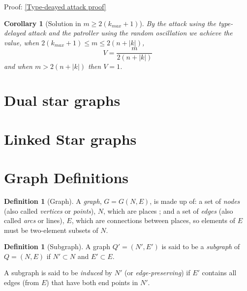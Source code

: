 \documentclass[a4paper,10pt]{article}
\newtheorem{corollary}[theorem]{Corollary}
\theoremstyle{definition}
\newtheorem{definition}[theorem]{Definition}
\theoremstyle{definition}
\theoremstyle{remark}
\theoremstyle{definition}
\begin{document}
Proof: \ref{Type-deayed attack proof}


\begin{corollary}[Solution in $m \geq 2(k_{max}+1)$]
By the attack using the type-delayed attack and the patroller using the random oscillation we achieve the value, when $2(k_{max}+1) \leq m \leq 2(n+|k|)$,
$$V= \frac{m}{2(n+|k|)} $$
and when $m > 2(n+|k|)$ then $V=1$.
\end{corollary}

\section{Dual star graphs}

\section{Linked Star graphs}




\newpage
\appendix
{}
\appendixpage
\addappheadtotoc
\section{Graph Definitions}

\begin{definition}[Graph]
A \textit{graph}, $G=G(N,E)$, is made up of: a set of \textit{nodes} (also called \textit{vertices} or \textit{points}), $N$, which are places ; and a set of \textit{edges} (also called \textit{arcs} or lines), $E$, which are connections between places, so elements of $E$ must be two-element subsets of $N$.
\end{definition}


\begin{definition}[Subgraph]
A graph $Q'=(N',E')$ is said to be a \textit{subgraph} of $Q=(N,E)$ if $N' \subset N$ and $E' \subset E$.

A subgraph is said to be \textit{induced} by $N'$ (or \textit{edge-preserving}) if $E'$ contains all edges (from $E$) that have both end points in $N'$.
\end{definition}
\end{document}
